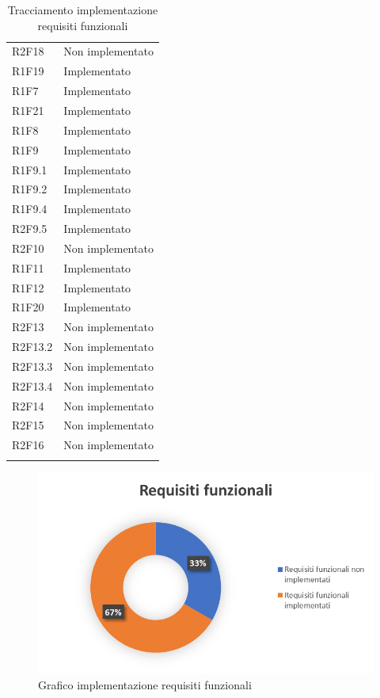 \begin{longtable} {
            >{\centering}p{64.5mm} 
            >{}p{64.5mm}
            }
            R2F18 & Non implementato \TBstrut \\ [2mm]
            R1F19 & Implementato \TBstrut \\ [2mm]
            R1F7 & Implementato \TBstrut \\ [2mm]
            R1F21 & Implementato \TBstrut \\ [2mm]
            R1F8 & Implementato \TBstrut \\ [2mm]
            R1F9 & Implementato \TBstrut \\ [2mm]
            R1F9.1 & Implementato \TBstrut \\ [2mm]
            R1F9.2 & Implementato \TBstrut \\ [2mm]
            R1F9.4 & Implementato \TBstrut \\ [2mm]
            R2F9.5 & Implementato \TBstrut \\ [2mm]
            R2F10 & Non implementato \TBstrut \\ [2mm]
            R1F11 & Implementato \TBstrut \\ [2mm]
            R1F12 & Implementato \TBstrut \\ [2mm]	
            R1F20 & Implementato \TBstrut \\ [2mm]	
            R2F13 &	Non implementato \TBstrut \\ [2mm]					
            R2F13.2 & Non implementato \TBstrut \\ [2mm]		
            R2F13.3 & Non implementato \TBstrut \\ [2mm]
            R2F13.4 & Non implementato \TBstrut \\ [2mm]		
            R2F14 &	Non implementato \TBstrut \\ [2mm]
            R2F15 &	Non implementato \TBstrut \\ [2mm]		
            R2F16 & Non implementato \TBstrut \\ [2mm]
            \rowcolor{white}
            \caption{Tracciamento implementazione requisiti funzionali}
        \end{longtable}
        \begin{figure}[H]
            \includegraphics[width=\textwidth,height=\textheight,keepaspectratio]{./img/Grafici/req.png}
            \caption{Grafico implementazione requisiti funzionali}
        \end{figure}
